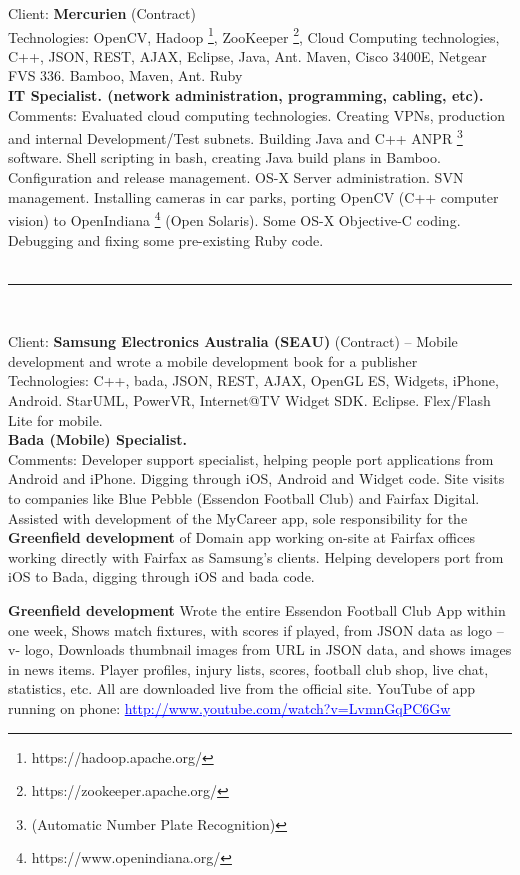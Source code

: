 \documentclass{article}
\let\svthefootnote\thefootnote
\newcommand\Cfootnote[2][black]{\def\thefootnote{\color{#1}\svthefootnote}%
  \footnote{\color{#1}#2}}
\begin{document}
Client: 	\textbf  {Mercurien } (Contract) \\
Technologies: 	OpenCV, Hadoop\Cfootnote[blue]{https://hadoop.apache.org/}, ZooKeeper\Cfootnote[blue]{https://zookeeper.apache.org/}, Cloud Computing technologies, C++, JSON, REST, AJAX, Eclipse, Java, Ant. Maven, Cisco 3400E, Netgear FVS 336.  Bamboo, Maven, Ant. Ruby \\
\textbf{ IT Specialist. (network administration, programming, cabling, etc). } \\
Comments:	Evaluated cloud computing technologies. Creating VPNs, production 
		and internal Development/Test subnets. Building Java and C++ 
ANPR \footnote{(Automatic Number Plate Recognition)} software. Shell scripting in bash, creating Java build plans in Bamboo. Configuration and release management. OS-X Server administration. SVN management.  Installing cameras in car parks, porting OpenCV (C++ computer vision) to OpenIndiana\Cfootnote[blue]{https://www.openindiana.org/} (Open Solaris). Some OS-X Objective-C coding. Debugging and fixing some pre-existing Ruby code. \\
\\

\noindent\hfil\rule{0.5\textwidth}{.4pt}\hfil
\\

\newpage


Client: 	\textbf  {Samsung Electronics Australia (SEAU)}  (Contract)  -- Mobile development and wrote a mobile development book for a publisher  \\
Technologies: 	C++, bada, JSON, REST, AJAX, OpenGL ES, Widgets, iPhone, Android. StarUML, PowerVR, Internet@TV Widget SDK. Eclipse. Flex/Flash Lite for mobile. \\
\textbf{  Bada (Mobile) Specialist. } \\
Comments:	Developer support specialist, helping people port applications from Android and iPhone. Digging through iOS, Android and Widget code. Site visits to companies like Blue Pebble (Essendon Football Club) and Fairfax Digital. Assisted with development of the MyCareer app, sole responsibility for the {\bf Greenfield development} of Domain app working on-site at Fairfax offices working directly with Fairfax as Samsung’s clients. Helping developers port from iOS to Bada, digging through iOS and bada code.  

	{\bf Greenfield development} Wrote the entire Essendon Football Club App within one week, Shows match fixtures, with scores if played, from JSON data as logo –v- logo, Downloads thumbnail images from URL in JSON data, and shows images in news items. Player profiles, injury lists, scores, football club shop, live chat, statistics, etc. All are downloaded live from the official site. YouTube of app running on phone: \textcolor{blue}{ \underline{http://www.youtube.com/watch?v=LvmnGqPC6Gw}}\\
\end{document}
